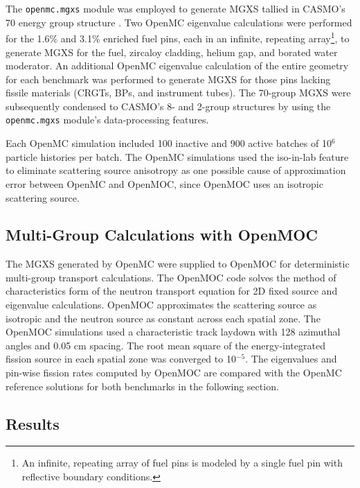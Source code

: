 The \texttt{openmc.mgxs} module was employed to generate MGXS tallied in CASMO's 70 energy group structure \cite{rhodes2006casmo}. Two OpenMC eigenvalue calculations were performed for the 1.6\% and 3.1\% enriched fuel pins, each in an infinite, repeating array\footnote{An infinite, repeating array of fuel pins is modeled by a single fuel pin with reflective boundary conditions.}, to generate MGXS for the fuel, zircaloy cladding, helium gap, and borated water moderator. An additional OpenMC eigenvalue calculation of the entire geometry for each benchmark was performed to generate MGXS for those pins lacking fissile materials (CRGTs, BPs, and instrument tubes). The 70-group MGXS were subsequently condensed to CASMO's 8- and 2-group structures by using the \texttt{openmc.mgxs} module's data-processing features.

Each OpenMC simulation included 100 inactive and 900 active batches of 10$^{6}$ particle histories per batch. The OpenMC simulations used the iso-in-lab feature to eliminate scattering source anisotropy as one possible cause of approximation error between OpenMC and OpenMOC, since OpenMOC uses an isotropic scattering source.


\subsection{Multi-Group Calculations with OpenMOC}
\label{subsec:openmoc}

The MGXS generated by OpenMC were supplied to OpenMOC \cite{boyd2014openmoc} for deterministic multi-group transport calculations. The OpenMOC code solves the method of characteristics form of the neutron transport equation for 2D fixed source and eigenvalue calculations. OpenMOC approximates the scattering source as isotropic and the neutron source as constant across each spatial zone. The OpenMOC simulations used a characteristic track laydown with 128 azimuthal angles and 0.05 cm spacing. The root mean square of the energy-integrated fission source in each spatial zone was converged to 10$^{-5}$. The eigenvalues and pin-wise fission rates computed by OpenMOC are compared with the OpenMC reference solutions for both benchmarks in the following section.


\subsection{Results}
\label{subsec:results}

